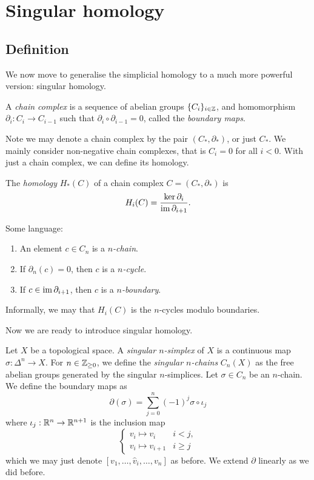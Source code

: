 \section{Singular homology}

\subsection{Definition}

We now move to generalise the simplicial homology to a much more powerful version: singular homology.

\begin{definition}
	A \emph{chain complex} is a sequence of abelian groups $\{C_i\}_{i \in \mathbb{Z}}$, and homomorphism $\partial_i: C_i \to C_{i-1}$ such that $\partial_i \circ \partial_{i-1} = 0$, called the \emph{boundary maps}.
\end{definition}

Note we may denote a chain complex by the pair $(C_*, \partial_*)$, or just $C_*$. We mainly consider non-negative chain complexes, that is $C_i = 0$ for all $i < 0$. With just a chain complex, we can define its homology.

\begin{definition}[Homology]
	The \emph{homology} $H_*(C)$ of a chain complex $C = (C_*, \partial_*)$ is
	\[
		H_i(C) = \frac{\ker \partial_i}{\operatorname{im} \partial_{i+1}}.
	\]
\end{definition}

Some language:
\begin{enumerate}
	\item An element $c \in C_n$ is a \emph{$n$-chain}.
	\item If $\partial_n(c) = 0$, then $c$ is a \emph{$n$-cycle}.
	\item If $c \in \operatorname{im} \partial_{i+1}$, then $c$ is a \emph{$n$-boundary}.
\end{enumerate}
Informally, we may that $H_i(C)$ is the $n$-cycles modulo boundaries.

Now we are ready to introduce singular homology.

\begin{definition}
	Let $X$ be a topological space. A \emph{singular $n$-simplex} of $X$ is a continuous map $\sigma: \Delta^n \to X$. For $n \in \mathbb{Z}_{\geq 0}$, we define the \emph{singular $n$-chains} $C_n(X)$ as the free abelian groups generated by the singular $n$-simplices. Let $\sigma \in C_n$ be an $n$-chain. We define the boundary maps as
	\[
		\partial(\sigma) = \sum_{j=0}^n (-1)^j \sigma \circ \iota_j
	\]
	where $\iota_j: \mathbb{R}^n \to \mathbb{R}^{n+1}$ is the inclusion map
	\[
		\begin{cases}
			v_i \mapsto v_i     & i < j,   \\
			v_i \mapsto v_{i+1} & i \geq j
		\end{cases}
	\]
	which we may just denote $[v_1, \ldots, \hat{v}_i, \ldots, v_n]$ as before.
	We extend $\partial$ linearly as we did before.
\end{definition}

